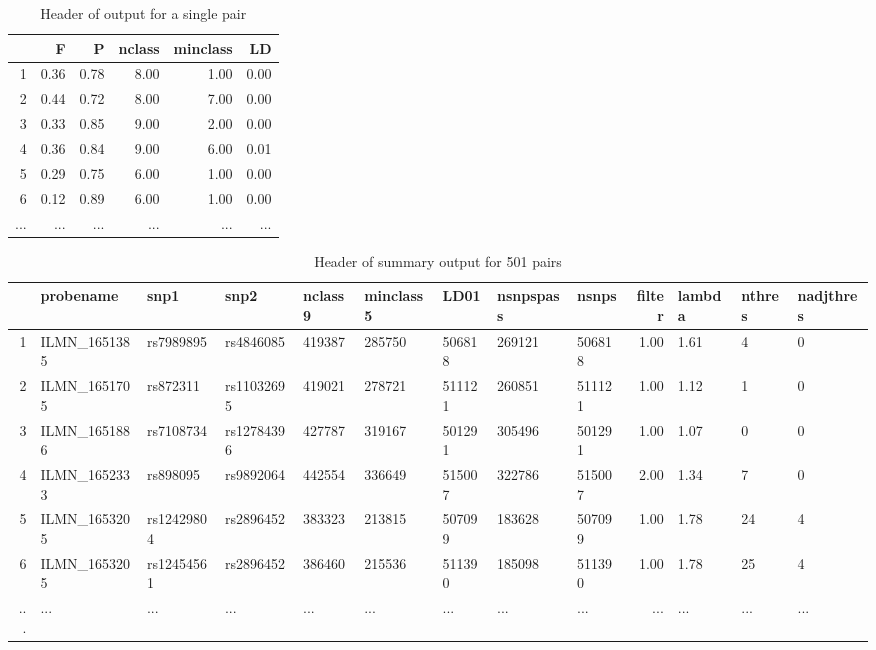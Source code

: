 \documentclass[paper=a4, fontsize=11pt]{scrartcl}					%
\numberwithin{equation}{section}									%
\numberwithin{figure}{section}										%
\numberwithin{table}{section}										%
\begin{document}
\begin{landscape}

\begin{table}[ht]
\centering
\begin{tabular}{rrrrrr}
  \hline
 & F & P & nclass & minclass & LD \\ 
  \hline
1 & 0.36 & 0.78 & 8.00 & 1.00 & 0.00 \\ 
  2 & 0.44 & 0.72 & 8.00 & 7.00 & 0.00 \\ 
  3 & 0.33 & 0.85 & 9.00 & 2.00 & 0.00 \\ 
  4 & 0.36 & 0.84 & 9.00 & 6.00 & 0.01 \\ 
  5 & 0.29 & 0.75 & 6.00 & 1.00 & 0.00 \\ 
  6 & 0.12 & 0.89 & 6.00 & 1.00 & 0.00 \\
  ... & ... & ... & ... & ...& ... \\ 
   \hline
\end{tabular}
\caption*{Header of output for a single pair}
\end{table}

\vspace{2cm}


\begin{table}[ht]
\centering
\begin{tabular}{rllllllllrlll}
  \hline
 & probename & snp1 & snp2 & nclass9 & minclass5 & LD01 & nsnpspass & nsnps & filter & lambda & nthres & nadjthres \\ 
  \hline
1 & ILMN\_1651385 & rs7989895 & rs4846085 & 419387 & 285750 & 506818 & 269121 & 506818 & 1.00 & 1.61 & 4 & 0 \\ 
  2 & ILMN\_1651705 & rs872311 & rs11032695 & 419021 & 278721 & 511121 & 260851 & 511121 & 1.00 & 1.12 & 1 & 0 \\ 
  3 & ILMN\_1651886 & rs7108734 & rs12784396 & 427787 & 319167 & 501291 & 305496 & 501291 & 1.00 & 1.07 & 0 & 0 \\ 
  4 & ILMN\_1652333 & rs898095 & rs9892064 & 442554 & 336649 & 515007 & 322786 & 515007 & 2.00 & 1.34 & 7 & 0 \\ 
  5 & ILMN\_1653205 & rs12429804 & rs2896452 & 383323 & 213815 & 507099 & 183628 & 507099 & 1.00 & 1.78 & 24 & 4 \\ 
  6 & ILMN\_1653205 & rs12454561 & rs2896452 & 386460 & 215536 & 511390 & 185098 & 511390 & 1.00 & 1.78 & 25 & 4 \\ 
  ... & ... & ... & ... & ... & ... & ... & ... & ... & ... & ... & ... & ... \\ 
   \hline
\end{tabular}
\caption*{Header of summary output for 501 pairs}
\end{table}
\end{landscape}
\end{document}
